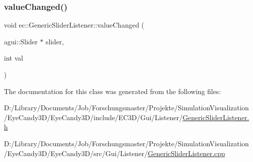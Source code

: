 \mbox{\label{classec_1_1_generic_slider_listener_a884faf715962f7785174edec063aa145}} 
\subsubsection{\texorpdfstring{value\+Changed()}{valueChanged()}}
{\footnotesize\ttfamily void ec\+::\+Generic\+Slider\+Listener\+::value\+Changed (\begin{DoxyParamCaption}\item[{agui\+::\+Slider $\ast$}]{slider,  }\item[{int}]{val }\end{DoxyParamCaption})\hspace{0.3cm}{\ttfamily [override]}}



The documentation for this class was generated from the following files\+:\begin{DoxyCompactItemize}
\item 
D\+:/\+Library/\+Documents/\+Job/\+Forschungsmaster/\+Projekte/\+Simulation\+Visualization/\+Eye\+Candy3\+D/\+Eye\+Candy3\+D/include/\+E\+C3\+D/\+Gui/\+Listener/\mbox{\hyperlink{_generic_slider_listener_8h}{Generic\+Slider\+Listener.\+h}}\item 
D\+:/\+Library/\+Documents/\+Job/\+Forschungsmaster/\+Projekte/\+Simulation\+Visualization/\+Eye\+Candy3\+D/\+Eye\+Candy3\+D/src/\+Gui/\+Listener/\mbox{\hyperlink{_generic_slider_listener_8cpp}{Generic\+Slider\+Listener.\+cpp}}\end{DoxyCompactItemize}

